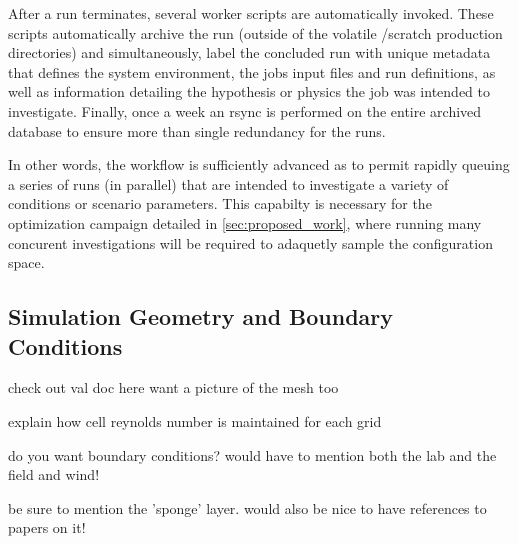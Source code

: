 After a run terminates, several worker scripts are automatically invoked. 
These scripts automatically archive the run (outside of the volatile /scratch 
production directories) and simultaneously, label the concluded run with unique metadata
that defines the system environment, the jobs input files and run definitions, as well as 
information detailing the hypothesis or physics the job was intended to investigate.
Finally, once a week an rsync is performed on the entire archived database to ensure 
more than single redundancy for the runs.

In other words, the workflow is sufficiently advanced as to permit rapidly queuing 
a series of runs (in parallel) that are intended to investigate a variety of conditions or 
scenario parameters. This capabilty is necessary for the optimization campaign detailed 
in \ref{sec:proposed_work}, where running many concurent investigations will be required to
adaquetly sample the configuration space. 

\subsection{Simulation Geometry and Boundary Conditions}

check out val doc here
want a picture of the mesh too

explain how cell reynolds number is maintained for each grid

do you want boundary conditions? would have to mention both the lab and
the field and wind!

be sure to mention the 'sponge' layer. would also be nice to have references to papers on it!

